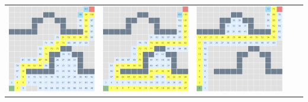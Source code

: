 \documentclass{article}
\begin{document}
\begin{center}
\begin{tabular}{c c c c c}
\includegraphics[scale=0.15]{images/scr27.png} &
\includegraphics[scale=0.15]{images/scr28.png} &
\includegraphics[scale=0.15]{images/scr29.png} \\

\end{tabular}
\end{center}
\end{document}
